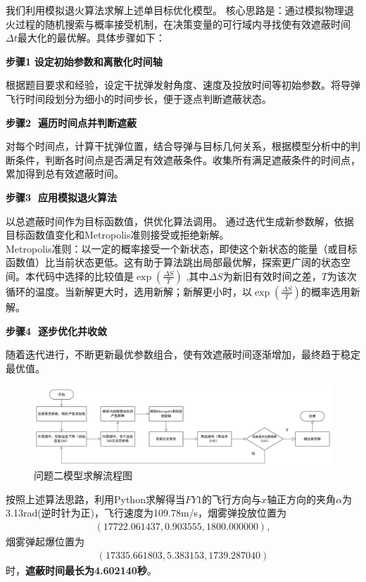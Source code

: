 \documentclass[../main.tex]{subfiles}
\begin{document}

我们利用模拟退火算法求解上述单目标优化模型。
核心思路是：通过模拟物理退火过程的随机搜索与概率接受机制，在决策变量的可行域内寻找使有效遮蔽时间$\Delta t$最大化的最优解。具体步骤如下：

\noindent \textbf{步骤1$\,\,$设定初始参数和离散化时间轴}

根据题目要求和经验，设定干扰弹发射角度、速度及投放时间等初始参数。将导弹飞行时间段划分为细小的时间步长，便于逐点判断遮蔽状态。

\noindent \textbf{步骤2 $\,\,$遍历时间点并判断遮蔽}

对每个时间点，计算干扰弹位置，结合导弹与目标几何关系，根据模型分析中的判断条件，判断各时间点是否满足有效遮蔽条件。收集所有满足遮蔽条件的时间点，累加得到总有效遮蔽时间。

\noindent \textbf{步骤3 $\,\,$应用模拟退火算法}

 以总遮蔽时间作为目标函数值，供优化算法调用。
 通过迭代生成新参数解，依据目标函数值变化和Metropolis准则接受或拒绝新解。\\
    Metropolis准则：以一定的概率接受一个新状态，即使这个新状态的能量（或目标函数值）比当前状态更低。这有助于算法跳出局部最优解，探索更广阔的状态空间。本代码中选择的比较值是$\exp \left( \frac{\Delta S}{T} \right)$ ,其中$\Delta S$为新旧有效时间之差，$T$为该次循环的温度。当新解更大时，选用新解；新解更小时，以$\exp \left( \frac{\Delta S}{T} \right)$的概率选用新解。

\noindent \textbf{步骤4 $\,\,$逐步优化并收敛}

随着迭代进行，不断更新最优参数组合，使有效遮蔽时间逐渐增加，最终趋于稳定最优值。

\begin{figure}[H]
\centering
\includegraphics[scale=0.35]{问题二模型求解流程图.png}
\caption{问题二模型求解流程图}
\label{图2}
\end{figure}

按照上述算法思路，利用Python求解得当$FY1$的飞行方向与$x$轴正方向的夹角$\alpha$为3.13rad(逆时针为正)，飞行速度为109.78m/s，烟雾弹投放位置为
\begin{align}
(17722.061437,0.903555,1800.000000),
\end{align}
烟雾弹起爆位置为
\begin{align}
(17335.661803,5.383153,1739.287040)
\end{align}
时，\textbf{遮蔽时间最长为4.602140秒}。
\end{document}
